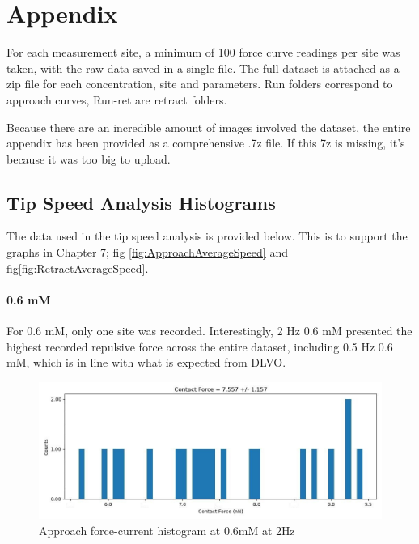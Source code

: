 \chapter{Appendix}

For each measurement site, a minimum of 100 force curve readings per site was taken, with the raw data saved in a single file. The full dataset is attached as a zip file for each concentration, site and parameters. Run folders correspond to approach curves, Run-ret are retract folders.

Because there are an incredible amount of images involved the dataset, the entire appendix has been provided as a comprehensive .7z file. If this 7z is missing, it's because it was too big to upload.

\section{Tip Speed Analysis Histograms}

The data used in the tip speed analysis is provided below. This is to support the  graphs in Chapter 7; fig \ref{fig:ApproachAverageSpeed} and fig\ref{fig:RetractAverageSpeed}.


\subsubsection*{0.6 mM}
For 0.6 mM, only one site was recorded. Interestingly, 2 Hz 0.6 mM presented the highest recorded repulsive force across the entire dataset, including 0.5 Hz 0.6 mM, which is in line with what is expected from DLVO. 

\begin{figure}[h!!!]
\centering
\includegraphics[width=\textwidth]{chapter7/Tip speed/0.6mM/approach_f_c_hist.jpg}
\caption{Approach force-current histogram at 0.6mM at 2Hz}
\label{fig:0.62hz.png}        
\end{figure}

